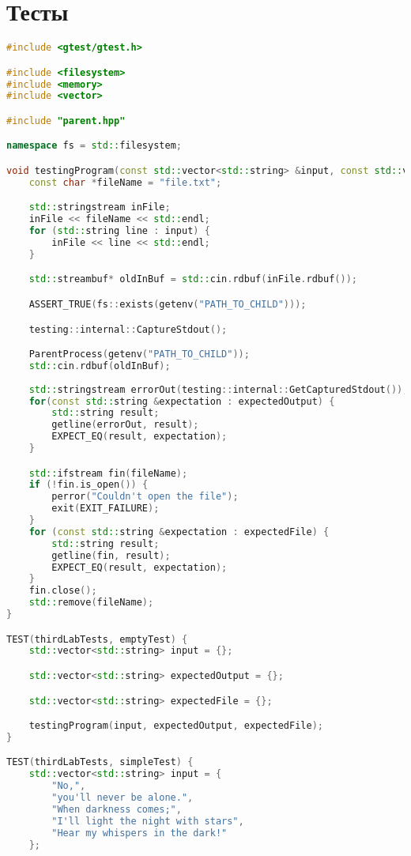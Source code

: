 \documentclass[a4paper, 12pt]{article}
\begin{document}
\newpage
\section{Тесты}
\begin{lstlisting}[language=C++]
#include <gtest/gtest.h>

#include <filesystem>
#include <memory>
#include <vector>

#include "parent.hpp"

namespace fs = std::filesystem;

void testingProgram(const std::vector<std::string> &input, const std::vector<std::string> &expectedOutput, const std::vector<std::string> &expectedFile) {
    const char *fileName = "file.txt";

    std::stringstream inFile;
    inFile << fileName << std::endl;
    for (std::string line : input) {
        inFile << line << std::endl;
    }

    std::streambuf* oldInBuf = std::cin.rdbuf(inFile.rdbuf()); 

    ASSERT_TRUE(fs::exists(getenv("PATH_TO_CHILD")));

    testing::internal::CaptureStdout();

    ParentProcess(getenv("PATH_TO_CHILD"));
    std::cin.rdbuf(oldInBuf);
    
    std::stringstream errorOut(testing::internal::GetCapturedStdout());
    for(const std::string &expectation : expectedOutput) {
        std::string result;
        getline(errorOut, result);
        EXPECT_EQ(result, expectation);
    }

    std::ifstream fin(fileName);
    if (!fin.is_open()) {
        perror("Couldn't open the file");
        exit(EXIT_FAILURE);
    }
    for (const std::string &expectation : expectedFile) {
        std::string result;
        getline(fin, result);
        EXPECT_EQ(result, expectation);
    }
    fin.close();
    std::remove(fileName);
}

TEST(thirdLabTests, emptyTest) {
    std::vector<std::string> input = {};

    std::vector<std::string> expectedOutput = {};

    std::vector<std::string> expectedFile = {};

    testingProgram(input, expectedOutput, expectedFile);
}

TEST(thirdLabTests, simpleTest) {
    std::vector<std::string> input = {
        "No,",
        "you'll never be alone.",
        "When darkness comes;",
        "I'll light the night with stars",
        "Hear my whispers in the dark!"
    };


\end{lstlisting}
\end{document}
